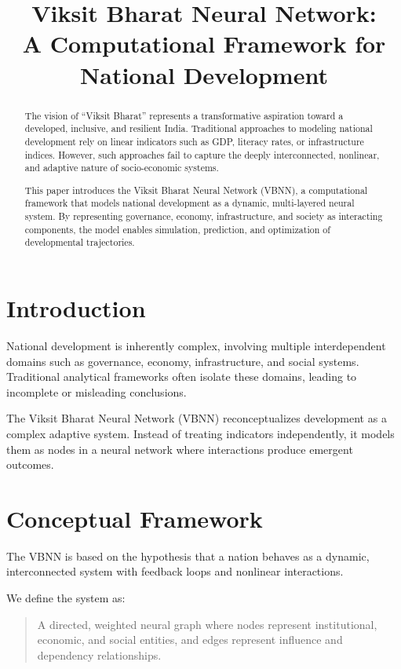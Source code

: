 \documentclass[12pt]{article}
\title{\textbf{Viksit Bharat Neural Network: \\ A Computational Framework for National Development}}
\author{}
\date{}
\begin{document}
\maketitle

\begin{abstract}
The vision of “Viksit Bharat” represents a transformative aspiration toward a developed, inclusive, and resilient India. Traditional approaches to modeling national development rely on linear indicators such as GDP, literacy rates, or infrastructure indices. However, such approaches fail to capture the deeply interconnected, nonlinear, and adaptive nature of socio-economic systems.

This paper introduces the Viksit Bharat Neural Network (VBNN), a computational framework that models national development as a dynamic, multi-layered neural system. By representing governance, economy, infrastructure, and society as interacting components, the model enables simulation, prediction, and optimization of developmental trajectories.
\end{abstract}

\section{Introduction}

National development is inherently complex, involving multiple interdependent domains such as governance, economy, infrastructure, and social systems. Traditional analytical frameworks often isolate these domains, leading to incomplete or misleading conclusions.

The Viksit Bharat Neural Network (VBNN) reconceptualizes development as a complex adaptive system. Instead of treating indicators independently, it models them as nodes in a neural network where interactions produce emergent outcomes.

\section{Conceptual Framework}

The VBNN is based on the hypothesis that a nation behaves as a dynamic, interconnected system with feedback loops and nonlinear interactions.

We define the system as:

\begin{quote}
A directed, weighted neural graph where nodes represent institutional, economic, and social entities, and edges represent influence and dependency relationships.
\end{quote}
\end{document}
